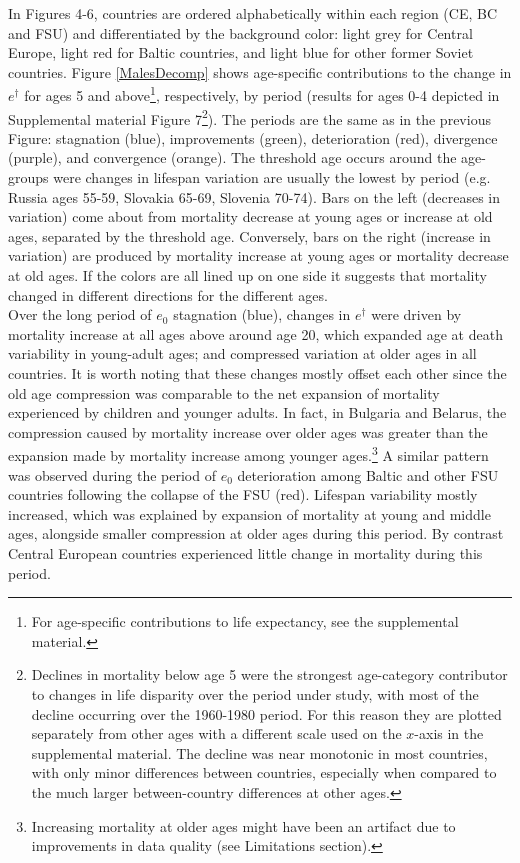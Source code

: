 \documentclass{article}
\begin{document}
\begin{spacing}{1.5}
In Figures 4-6, countries are ordered alphabetically within each region (CE, BC and FSU) and differentiated by the background color: light grey for Central Europe, light red for Baltic countries, and light blue for other former Soviet countries. Figure  \ref{MalesDecomp} shows age-specific contributions to the change in $e^\dagger$ for ages 5 and above\footnote{For age-specific contributions to life expectancy, see the supplemental material.}, respectively, by period (results for ages 0-4 depicted in Supplemental material Figure 7\footnote{Declines in mortality below age 5 were the strongest age-category contributor to changes in life disparity over the period under study, with most of the decline occurring over the 1960-1980 period. For this reason they are plotted separately from other ages with a different scale used on the $x$-axis in the supplemental material. The decline was near monotonic in most countries, with only minor differences between countries, especially when compared to the much larger between-country differences at other ages.}). The periods are the same as in the previous Figure:  stagnation (blue), improvements (green), deterioration (red), divergence (purple), and convergence (orange). The threshold age occurs around the age-groups were changes in lifespan variation are usually the lowest by period (e.g. Russia ages 55-59, Slovakia 65-69, Slovenia 70-74). Bars on the left (decreases in variation) come about from mortality decrease at young ages or increase at old ages, separated by the threshold age. Conversely, bars on the right (increase in variation) are produced by mortality increase at young ages or mortality decrease at old ages. If the colors are all lined up on one side it suggests that mortality changed in different directions for the different ages. \\


Over the long period of $e_0$ stagnation (blue), changes in $e^\dagger$ were driven by mortality increase at all ages above around age 20, which expanded age at death variability in young-adult ages; and compressed variation at older ages in all countries. It is worth noting that these changes mostly offset each other since the old age compression was comparable to the net expansion of mortality experienced by children and younger adults. In fact, in Bulgaria and Belarus, the compression caused by mortality increase over older ages was greater than the expansion made by mortality increase among younger ages.\footnote{Increasing mortality at older ages might have been an artifact due to improvements in data quality (see Limitations section).} A similar pattern was observed during the period of $e_0$ deterioration among Baltic and other FSU countries following the collapse of the FSU (red). Lifespan variability mostly increased, which was explained by expansion of mortality at young and middle ages, alongside smaller compression at older ages during this period. By contrast Central European countries experienced little change in mortality during this period.\\


\end{spacing}
\end{document}

